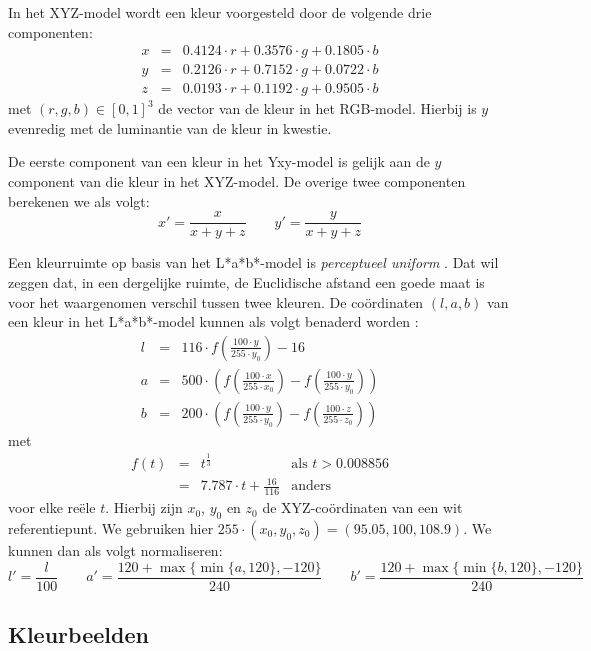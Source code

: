 In het XYZ-model wordt een kleur voorgesteld door de volgende drie componenten: 
$$
\begin{array}{rcl}
x & = & 0.4124 \cdot r + 0.3576 \cdot g + 0.1805 \cdot b \\
y & = & 0.2126 \cdot r + 0.7152 \cdot g + 0.0722 \cdot b \\
z & = & 0.0193 \cdot r + 0.1192 \cdot g + 0.9505 \cdot b
\end{array}
$$ met $(r,g,b) \in [0,1]^3$ de vector van de kleur in het RGB-model. Hierbij 
is $y$ evenredig met de luminantie van de kleur in kwestie. 

De eerste component van een kleur in het Yxy-model is gelijk aan de $y$ 
component van die kleur in het XYZ-model. De overige twee componenten berekenen 
we als volgt: $$ x' = \frac{x}{x+y+z} \qquad y' = \frac{y}{x+y+z} $$ 

Een kleurruimte op basis van het L*a*b*-model is \emph{perceptueel uniform} 
\cite{sharma:digital_color_imaging}. Dat wil zeggen dat, in een dergelijke 
ruimte, de Euclidische afstand een goede maat is voor het waargenomen verschil 
tussen twee kleuren. De co\"ordinaten $(l,a,b)$ van een kleur in het 
L*a*b*-model kunnen als volgt benaderd worden 
\cite{debaets:similariteitsmaten_voor_kleurbeelden, philips:beeldverwerking}: $$
\begin{array}{rcl}
l & = & 116 \cdot f(\frac{100 \cdot y}{255 \cdot y_0}) - 16 \\[5pt] a & = & 500 \cdot 
\left(f(\frac{100 \cdot x}{255 \cdot x_0}) - f(\frac{100 \cdot y}{255 \cdot y_0})\right) \\[5pt] b & = & 200 \cdot 
\left(f(\frac{100 \cdot y}{255 \cdot y_0}) - f(\frac{100 \cdot z}{255 \cdot z_0})\right)
\end{array}
$$ met $$
\begin{array}{rcll}
f(t) & = & t^\frac{1}{3} & \textrm{als } t > 0.008856 \\ & = & 7.787 \cdot t + 
\frac{16}{116} & \textrm{anders}
\end{array}
$$ voor elke re\"ele $t$. Hierbij zijn $x_0$, $y_0$ en $z_0$ de
XYZ-co\"ordinaten van een wit referentiepunt. We gebruiken hier 
$255 \cdot (x_0,y_0,z_0)=(95.05,100,108.9)$.
We kunnen dan als volgt normaliseren: $$ l' = \frac{l}{100} \qquad a' = \frac{120 + 
\max\{\min\{a,120\},-120\}}{240} \qquad b' = \frac{120 + \max\{\min\{b,120\},-120\}}{240} $$


\subsection{Kleurbeelden}

